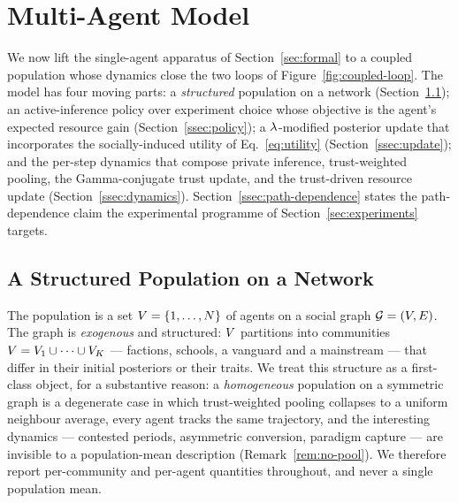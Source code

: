 \section{Multi-Agent Model}
\label{sec:model}

We now lift the single-agent apparatus of Section~\ref{sec:formal} to a
coupled population whose dynamics close the two loops of
Figure~\ref{fig:coupled-loop}. The model has four moving parts: a
\emph{structured} population on a network (Section~\ref{ssec:setup});
an active-inference policy over experiment choice whose objective is
the agent's expected resource gain (Section~\ref{ssec:policy}); a
$\lambda$-modified posterior update that incorporates the
socially-induced utility of Eq.~\eqref{eq:utility}
(Section~\ref{ssec:update}); and the per-step dynamics that compose
private inference, trust-weighted pooling, the Gamma-conjugate trust
update, and the trust-driven resource update
(Section~\ref{ssec:dynamics}). Section~\ref{ssec:path-dependence}
states the path-dependence claim the experimental programme of
Section~\ref{sec:experiments} targets.

\subsection{A Structured Population on a Network}
\label{ssec:setup}

The population is a set $V = \{1, \dots, N\}$ of agents
on a social graph $\mathcal{G} = (V, E)$. The graph is
\emph{exogenous} and structured: $V$ partitions into
communities $V = V_{1} \cup \dots \cup V_{K}$
--- factions, schools, a vanguard and a mainstream --- that differ in
their initial posteriors or their traits. We treat this structure as a
first-class object, for a substantive reason: a \emph{homogeneous}
population on a symmetric graph is a degenerate case in which
trust-weighted pooling collapses to a uniform neighbour average, every
agent tracks the same trajectory, and the interesting dynamics ---
contested periods, asymmetric conversion, paradigm capture --- are
invisible to a population-mean description (Remark~\ref{rem:no-pool}).
We therefore report per-community and per-agent quantities throughout,
and never a single population mean.

